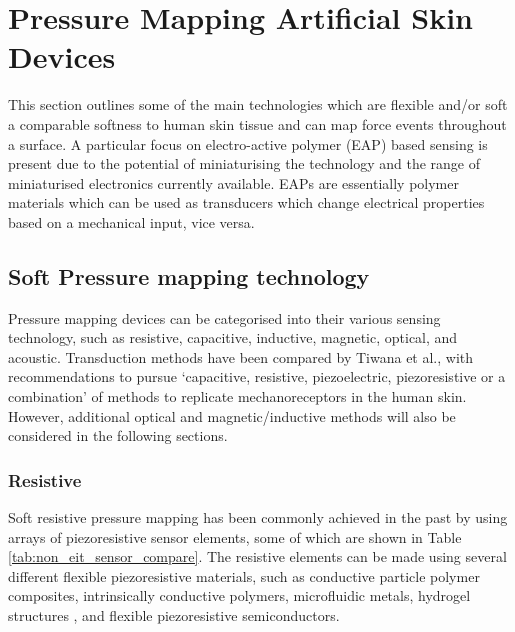 \section{Pressure Mapping Artificial Skin Devices}
This section outlines some of the main technologies which are flexible and/or soft a comparable softness to human skin tissue and can map force events throughout a surface. A particular focus on electro-active polymer (EAP) based sensing is present due to the potential of miniaturising the technology and the range of miniaturised electronics currently available. EAPs are essentially polymer materials which can be used as transducers which change electrical properties based on a mechanical input, vice versa.


\subsection{Soft Pressure mapping technology}
Pressure mapping devices can be categorised into their various sensing technology, such as resistive, capacitive, inductive, magnetic, optical, and acoustic. Transduction methods have been compared by Tiwana et al.\cite{Tiwana2012}, with recommendations to pursue `capacitive, resistive, piezoelectric, piezoresistive or a combination' of methods to replicate mechanoreceptors in the human skin. However, additional optical and magnetic/inductive methods will also be considered in the following sections.

\subsubsection{Resistive}
Soft resistive pressure mapping has been commonly achieved in the past by using arrays of piezoresistive sensor elements, some of which are shown in Table \ref{tab:non_eit_sensor_compare}. The resistive elements can be made using several different flexible piezoresistive materials, such as conductive particle polymer composites\cite{Sun2020,Lu2014,Spahr2017}, intrinsically conductive polymers\cite{Lu2014,Hazelton2023,Mukherjee2023}, microfluidic metals\cite{Park2010,Jung2015,Kim2019}, hydrogel structures \cite{Yuk2016,Park2022,Chen2023}, and flexible piezoresistive semiconductors\cite{Xu2023,Sim2019}.

